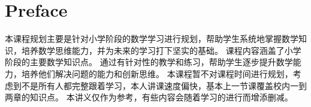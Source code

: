 \chapter*{Preface}
本课程规划主要是针对小学阶段的数学学习进行规划，帮助学生系统地掌握数学知识，培养数学思维能力，并为未来的学习打下坚实的基础。
课程内容涵盖了小学阶段的主要数学知识点。\newline
\indent 通过有针对性的教学和练习，帮助学生逐步提升数学能力，培养他们解决问题的能力和创新思维。 \newline
\indent 本课程暂不对课程时间进行规划，考虑到不是所有人都完整跟着学习，本人讲课速度偏快，基本上一节课覆盖校内一到两章的知识点。\newline
\indent 本讲义仅作为参考，有些内容会随着学习的进行而增添删减。
